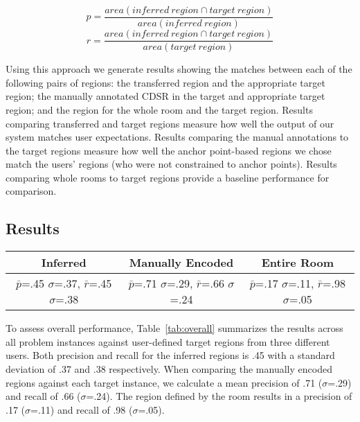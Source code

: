 \begin{equation}
	p=\frac{area(inferred\ region \cap target\ region)}{area(inferred\ region)}
\end{equation}
\begin{equation}
	r=\frac{area(inferred\ region \cap target\ region)}{area(target\ region)}
\end{equation}

Using this approach we generate results showing the matches between each of the following pairs of regions: the transferred region and the appropriate target region; the manually annotated CDSR in the target and appropriate target region; and the region for the whole room and the target region. 
 Results comparing transferred and target regions measure how well the output of our system matches user expectations. Results comparing the manual annotations to the target regions measure how well the anchor point-based regions we chose match the users' regions (who were not constrained to anchor points). Results comparing whole rooms to target regions provide a baseline performance for comparison. 


\subsection{Results}
\begin{table*}
	\center
\begin{tabular}{|c|c|c|}
\hline
Inferred & Manually Encoded & Entire Room \\
\hline
$\bar{p}$=.45 $\sigma$=.37, $\bar{r}$=.45 $\sigma$=.38 & $\bar{p}$=.71 $\sigma$=.29, $\bar{r}$=.66 $\sigma$=.24  & $\bar{p}$=.17 $\sigma$=.11, $\bar{r}$=.98 $\sigma$=.05  \\
\hline
\end{tabular}
\caption{Overall Performance}
  \label{tab:overall}	

\end{table*}

To assess overall performance, Table~\ref{tab:overall} summarizes the results across all problem instances against user-defined target regions from three different users. Both precision and recall for the inferred regions is .45 with a standard deviation of .37 and .38 respectively. When comparing the manually encoded regions against each target instance, we calculate a mean precision of .71 ($\sigma$=.29) and recall of .66 ($\sigma$=.24). The region defined by the room results in a precision of .17 ($\sigma$=.11) and recall of .98 ($\sigma$=.05).


